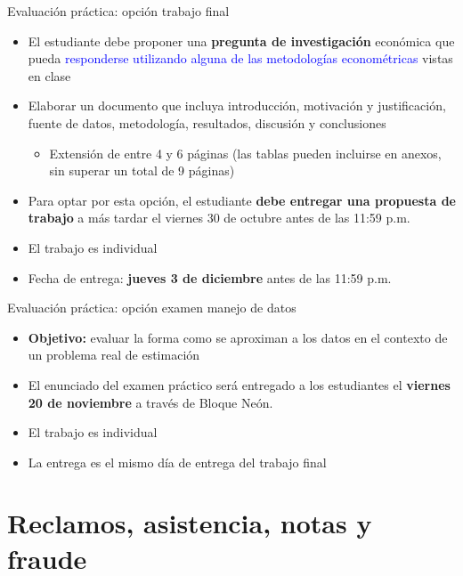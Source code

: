 \documentclass[10pt, xcolor=dvipsnames]{beamer}
\begin{document}
\begin{frame}{Evaluación práctica: opción trabajo final}
\begin{itemize}
    \item El estudiante debe proponer una \textbf{pregunta de investigación} económica que pueda \textcolor{blue}{responderse utilizando alguna de las metodologías econométricas} vistas en clase   
    \item Elaborar un documento que incluya introducción, motivación y justificación, fuente de datos, metodología, resultados, discusión y conclusiones
    \begin{itemize}
        \item Extensión de entre 4 y 6 páginas (las tablas pueden incluirse en anexos, sin superar un total de 9 páginas)
    \end{itemize}
    \item Para optar por esta opción, el estudiante \textbf{debe entregar una propuesta de trabajo} a más tardar el viernes 30 de octubre antes de las 11:59 p.m.
    \item El trabajo es individual
    \item Fecha de entrega: \textbf{jueves 3 de diciembre} antes de las 11:59 p.m.
\end{itemize}    
\end{frame}

\begin{frame}{Evaluación práctica: opción examen manejo de datos}
\begin{itemize}
    \item \textbf{Objetivo:} evaluar la forma como se aproximan a los datos en el contexto de un problema real de estimación
    \item El enunciado del examen práctico será entregado a los estudiantes el \textbf{viernes 20 de noviembre} a través de Bloque Neón. 
    \item El trabajo es individual
    \item La entrega es el mismo día de entrega del trabajo final
\end{itemize}
\end{frame}

\section{Reclamos, asistencia, notas y fraude}
\end{document}
